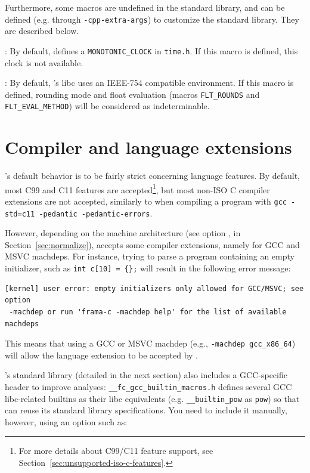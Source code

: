 Furthermore, some macros are undefined in the standard library, and can
be defined (e.g. through \lstinline|-cpp-extra-args|) to customize the \FramaC
standard library. They are described below.

\begin{description}
\item {}: By default, \FramaC defines
  a \lstinline|MONOTONIC_CLOCK| in \lstinline|time.h|. If this macro is defined,
  this clock is not available.
\item {}: By default, \FramaC's libc
  uses an IEEE-754 compatible environment. If this macro is defined,
  rounding mode and float evaluation
  (macros \lstinline|FLT_ROUNDS| and \lstinline|FLT_EVAL_METHOD|) will be
  considered as indeterminable.

\end{description}

\section{Compiler and language extensions}\label{sec:extensions}

\FramaC's default behavior is to be fairly strict concerning language features.
By default, most C99 and C11 features are accepted\footnote{For more details
about C99/C11 feature support, see
Section~\ref{sec:unsupported-iso-c-features}.}, but most non-ISO C compiler
extensions are not accepted, similarly to when compiling a program with
\verb+gcc -std=c11 -pedantic -pedantic-errors+.

However, depending on the machine architecture (see option
, in Section~\ref{sec:normalize}),
\FramaC accepts some compiler extensions, namely for GCC and MSVC machdeps.
For instance, trying to parse a program containing an empty initializer,
such as \verb+int c[10] = {};+ will result in the following error message:

\begin{verbatim}
[kernel] user error: empty initializers only allowed for GCC/MSVC; see option
 -machdep or run 'frama-c -machdep help' for the list of available machdeps
\end{verbatim}

This means that using a GCC or MSVC machdep (e.g., \verb+-machdep gcc_x86_64+)
will allow the language extension to be accepted by \FramaC.

\FramaC's standard library (detailed in the next section) also includes a
GCC-specific header to improve analyses:
\texttt{\_\_fc\_gcc\_builtin\_macros.h} defines several GCC libc-related
builtins as their libc equivalents (e.g. \texttt{\_\_builtin\_pow} as
\texttt{pow}) so that \FramaC can reuse its standard library specifications.
You need to include it manually, however, using an option such as:

